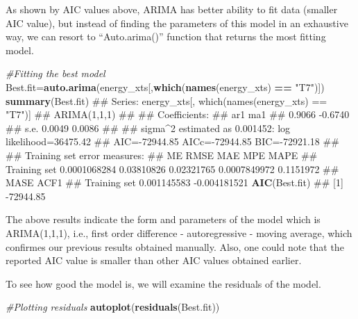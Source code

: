 \documentclass[]{article}
\newenvironment{Shaded}{\begin{snugshade}}{\end{snugshade}}
\newcommand{\KeywordTok}[1]{\textcolor[rgb]{0.13,0.29,0.53}{\textbf{#1}}}
\newcommand{\StringTok}[1]{\textcolor[rgb]{0.31,0.60,0.02}{#1}}
\newcommand{\CommentTok}[1]{\textcolor[rgb]{0.56,0.35,0.01}{\textit{#1}}}
\newcommand{\OperatorTok}[1]{\textcolor[rgb]{0.81,0.36,0.00}{\textbf{#1}}}
\newcommand{\NormalTok}[1]{#1}
\begin{document}
As shown by AIC values above, ARIMA has better ability to fit data
(smaller AIC value), but instead of finding the parameters of this model
in an exhaustive way, we can resort to ``Auto.arima()'' function that
returns the most fitting model.

\begin{Shaded}
\begin{Highlighting}[]
\CommentTok{#Fitting the best model }
\NormalTok{Best.fit=}\KeywordTok{auto.arima}\NormalTok{(energy_xts[,}\KeywordTok{which}\NormalTok{(}\KeywordTok{names}\NormalTok{(energy_xts) }\OperatorTok{==}\StringTok{ "T7"}\NormalTok{)])}
\KeywordTok{summary}\NormalTok{(Best.fit)}
\NormalTok{## Series: energy_xts[, which(names(energy_xts) == "T7")] }
\NormalTok{## ARIMA(1,1,1) }
\NormalTok{## }
\NormalTok{## Coefficients:}
\NormalTok{##          ar1      ma1}
\NormalTok{##       0.9066  -0.6740}
\NormalTok{## s.e.  0.0049   0.0086}
\NormalTok{## }
\NormalTok{## sigma^2 estimated as 0.001452:  log likelihood=36475.42}
\NormalTok{## AIC=-72944.85   AICc=-72944.85   BIC=-72921.18}
\NormalTok{## }
\NormalTok{## Training set error measures:}
\NormalTok{##                        ME       RMSE        MAE          MPE      MAPE}
\NormalTok{## Training set 0.0001068284 0.03810826 0.02321765 0.0007849972 0.1151972}
\NormalTok{##                     MASE         ACF1}
\NormalTok{## Training set 0.001145583 -0.004181521}
\KeywordTok{AIC}\NormalTok{(Best.fit)}
\NormalTok{## [1] -72944.85}
\end{Highlighting}
\end{Shaded}

The above results indicate the form and parameters of the model which is
ARIMA(1,1,1), i.e., first order difference - autoregressive - moving
average, which confirmes our previous results obtained manually. Also,
one could note that the reported AIC value is smaller than other AIC
values obtained earlier.

To see how good the model is, we will examine the residuals of the
model.

\begin{Shaded}
\begin{Highlighting}[]
\CommentTok{#Plotting residuals}
\KeywordTok{autoplot}\NormalTok{(}\KeywordTok{residuals}\NormalTok{(Best.fit))}
\end{Highlighting}
\end{Shaded}
\end{document}
